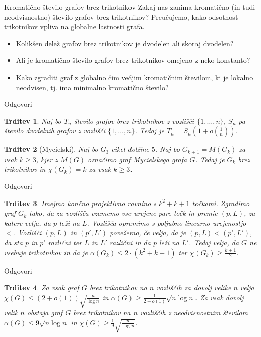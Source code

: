 \documentclass[t]{beamer} %
\newtheorem{trditev}{Trditev}
\newcommand{\fillblack}[1]{
\begin{tikzpicture}[remember picture, overlay]
    \node [shift={(0 cm,0cm)}]  at (current page.south west)
        {%
        \begin{tikzpicture}[remember picture, overlay] at (current page.south west)
            \draw [fill=black] (0, 0) -- (0,#1 \paperheight) --
                              (\paperwidth,#1 \paperheight) -- (\paperwidth,0) -- cycle ;
        \end{tikzpicture}
        };
        \draw (current page.north west) rectangle (current page.south east);
\end{tikzpicture}
}
\begin{document}
\begin{frame}[fragile]{Kromatično število grafov brez trikotnikov}
  Zakaj nas zanima kromatično (in tudi neodvisnostno) število grafov brez trikotnikov? Preučujemo, kako odsotnost trikotnikov vpliva na globalne lastnosti grafa.
  \pause
  \begin{itemize}
    \item Kolikšen delež grafov brez trikotnikov je dvodelen ali skoraj dvodelen? \pause
    \item Ali je kromatično število grafov brez trikotnikov omejeno z neko konstanto? \pause
    \item Kako zgraditi graf z globalno čim večjim kromatičnim številom, ki je lokalno neodvisen, tj. ima minimalno kromatično število?
  \end{itemize}
\end{frame}

\begin{frame}[fragile]{Odgovori}
  \begin{trditev}
    Naj bo $T_n$ število grafov brez trikotnikov z vozlišči $\{1, \ldots, n\}$, $S_n$ pa število dvodelnih grafov z vozlišči $\{1, \ldots, n\}$. Tedaj je $T_n = S_n(1 + o(\frac{1}{n}))$.
  \end{trditev}
  \pause
  \begin{trditev}[Mycielski]
    Naj bo $G_3$ cikel dolžine $5$. Naj bo $G_{k+1} = M(G_k)$ za vsak $k \geq 3$, kjer z $M(G)$ označimo graf Mycielskega grafa $G$. Tedaj je $G_k$ brez trikotnikov in $\chi(G_k) = k$ za vsak $k \geq 3$.
  \end{trditev}
\end{frame}

\begin{frame}{Odgovori}
  \begin{trditev}
    Imejmo končno projektivno ravnino s $k^2 + k + 1$ točkami. Zgradimo graf $G_k$ tako, da za vozlišča vzamemo vse urejene pare točk in premic $(p, L)$, za katere velja,
    da $p$ leži na $L$. Vozlišča opremimo s poljubno linearno urejenostjo $<$. Vozlišči $(p, L)$ in $(p', L')$ povežemo, če velja, da je $(p, L) < (p', L')$, da sta $p$ in $p'$ različni ter $L$ in $L'$
    različni in da $p$ leži na $L'$. Tedaj velja, da $G$ ne vsebuje trikotnikov in da je $\alpha(G_k) \leq 2 \cdot (k^2 + k + 1)$ ter $\chi(G_k) \geq \frac{k + 1}{2}$.
  \end{trditev}
\end{frame}

\begin{frame}{Odgovori}
  \begin{trditev}
    Za vsak graf $G$ brez trikotnikov na $n$ vozliščih za dovolj velike $n$ velja $\chi(G) \leq (2 + o(1))\sqrt{\frac{n}{\log{n}}}$ in $\alpha(G) \geq \frac{1}{2 + o(1)}\sqrt{n\log{n}}$. Za vsak dovolj velik $n$ obstaja graf $G$
    brez trikotnikov na $n$ vozliščih z neodvisnostnim številom $\alpha(G) \leq 9\sqrt{n\log{n}}$ in $\chi(G) \geq \frac{1}{9}\sqrt{\frac{n}{\log{n}}}$.
  \end{trditev}
\end{frame}
\end{document}
